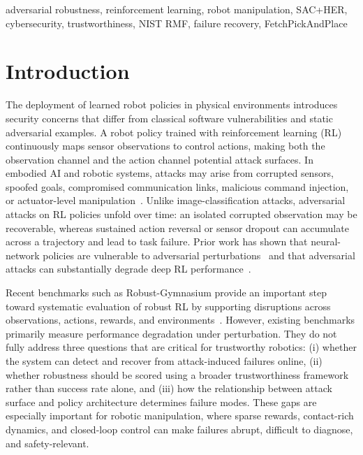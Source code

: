 \documentclass[conference]{IEEEtran}
\begin{document}
\begin{IEEEkeywords}
adversarial robustness, reinforcement learning, robot manipulation, SAC+HER,
cybersecurity, trustworthiness, NIST RMF, failure recovery, FetchPickAndPlace
\end{IEEEkeywords}


\section{Introduction}

The deployment of learned robot policies in physical environments introduces security
concerns that differ from classical software vulnerabilities and static adversarial
examples. A robot policy trained with reinforcement learning (RL) continuously maps
sensor observations to control actions, making both the observation channel and the
action channel potential attack surfaces. In embodied AI and robotic systems, attacks
may arise from corrupted sensors, spoofed goals, compromised communication links,
malicious command injection, or actuator-level manipulation~\cite{xing2025robustembodied}.
Unlike image-classification attacks, adversarial attacks on RL policies unfold over
time: an isolated corrupted observation may be recoverable, whereas sustained action
reversal or sensor dropout can accumulate across a trajectory and lead to task failure.
Prior work has shown that neural-network policies are vulnerable to adversarial
perturbations~\cite{huang2017adversarial} and that adversarial attacks can substantially
degrade deep RL performance~\cite{pattanaik2018robust}.

Recent benchmarks such as Robust-Gymnasium provide an important step toward systematic
evaluation of robust RL by supporting disruptions across observations, actions, rewards,
and environments~\cite{gu2025robustgymnasium}. However, existing benchmarks primarily
measure performance degradation under perturbation. They do not fully address three
questions that are critical for trustworthy robotics: (i) whether the system can detect
and recover from attack-induced failures online, (ii) whether robustness should be
scored using a broader trustworthiness framework rather than success rate alone, and
(iii) how the relationship between attack surface and policy architecture determines
failure modes. These gaps are especially important for robotic manipulation, where
sparse rewards, contact-rich dynamics, and closed-loop control can make failures abrupt,
difficult to diagnose, and safety-relevant.
\end{document}
